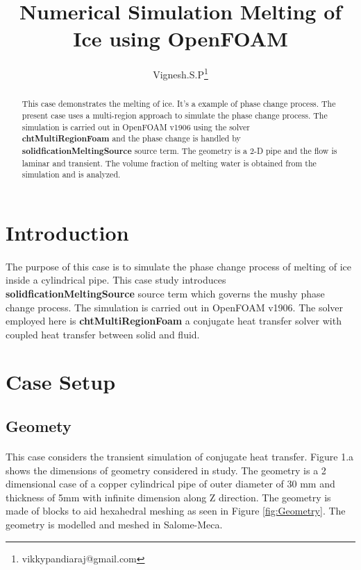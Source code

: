 \documentclass{article}
\begin{document}
    
\title{\textbf{Numerical Simulation Melting of Ice using OpenFOAM}}
\author{Vignesh.S.P\thanks{vikkypandiaraj@gmail.com}}
\date{}
\maketitle
\begin{abstract}
    This case demonstrates the melting of ice. It’s a example of phase change process. The present case uses a multi-region approach to simulate the phase change process. The simulation is carried out in OpenFOAM v1906 using the solver \textbf{chtMultiRegionFoam} and the phase change is handled by \textbf{solidficationMeltingSource} source term. The geometry is a 2-D pipe and the flow is laminar and transient. The volume fraction of melting water is obtained from the simulation and is analyzed. 
\end{abstract}

    

\section{Introduction}
    \paragraph*{}
    The purpose of this case is to simulate the phase change process of melting of ice inside a cylindrical pipe. This case study introduces \textbf{solidficationMeltingSource} source term which governs the mushy phase change process. The simulation is carried out in OpenFOAM v1906. The solver employed here is \textbf{chtMultiRegionFoam} a conjugate heat transfer solver with coupled heat transfer between solid and fluid.


\section{Case Setup}
    \subsection{Geomety}
    \paragraph*{}
    This case considers the transient simulation of conjugate heat transfer. Figure 1.a shows the dimensions of geometry considered in study. The geometry is a 2 dimensional case of a copper cylindrical pipe  of outer diameter of 30 mm and thickness of 5mm with infinite dimension along Z direction. The geometry  is made of blocks  to aid hexahedral meshing as seen in Figure \ref{fig:Geometry}. The geometry is modelled and meshed in Salome-Meca.
    
\end{document}

